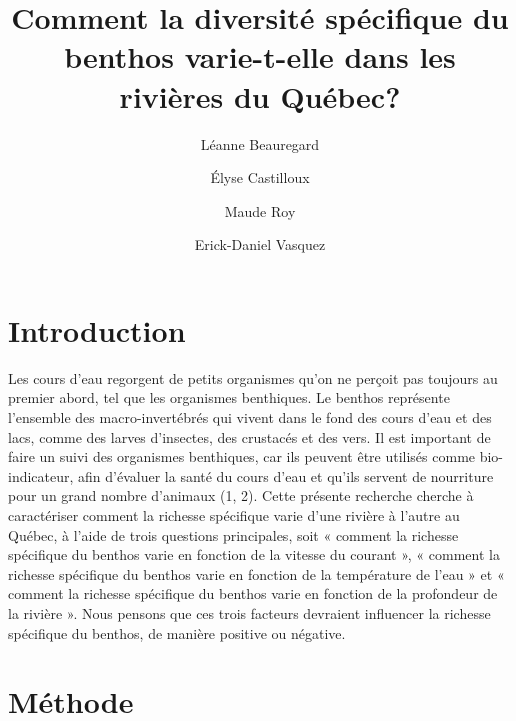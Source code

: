 \documentclass[9pt,twocolumn,twoside,]{pnas-new}
\title{Comment la diversité spécifique du benthos varie-t-elle dans les
rivières du Québec?}
\author[a]{Léanne Beauregard}
\author[a]{Élyse Castilloux}
\author[a]{Maude Roy}
\author[a]{Erick-Daniel Vasquez}
\affil[a]{Univeristé de Sherbrooke, Département de Biologie}
\begin{document}
\verticaladjustment{-2pt}



\maketitle
\thispagestyle{firststyle}


\acknow{}

\section{Introduction}\label{introduction}

Les cours d'eau regorgent de petits organismes qu'on ne perçoit pas
toujours au premier abord, tel que les organismes benthiques. Le benthos
représente l'ensemble des macro-invertébrés qui vivent dans le fond des
cours d'eau et des lacs, comme des larves d'insectes, des crustacés et
des vers. Il est important de faire un suivi des organismes benthiques,
car ils peuvent être utilisés comme bio-indicateur, afin d'évaluer la
santé du cours d'eau et qu'ils servent de nourriture pour un grand
nombre d'animaux (1, 2). Cette présente recherche cherche à caractériser
comment la richesse spécifique varie d'une rivière à l'autre au Québec,
à l'aide de trois questions principales, soit « comment la richesse
spécifique du benthos varie en fonction de la vitesse du courant », «
comment la richesse spécifique du benthos varie en fonction de la
température de l'eau » et « comment la richesse spécifique du benthos
varie en fonction de la profondeur de la rivière ». Nous pensons que ces
trois facteurs devraient influencer la richesse spécifique du benthos,
de manière positive ou négative.

\section{Méthode}\label{muxe9thode}
\end{document}
